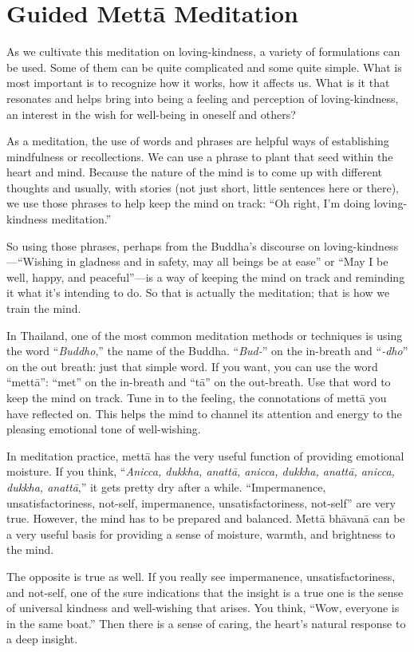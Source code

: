 \chapter{Guided Mettā Meditation}

As we cultivate this meditation on loving-kindness, a variety of
formulations can be used. Some of them can be quite complicated and some
quite simple. What is most important is to recognize how it works, how
it affects us. What is it that resonates and helps bring into being a
feeling and perception of loving-kindness, an interest in the wish for
well-being in oneself and others?

As a meditation, the use of words and phrases are helpful ways of
establishing mindfulness or recollections. We can use a phrase to plant
that seed within the heart and mind. Because the nature of the mind is
to come up with different thoughts and usually, with stories (not just
short, little sentences here or there), we use those phrases to help
keep the mind on track: “Oh right, I’m doing loving-kindness
meditation.”

So using those phrases, perhaps from the Buddha’s discourse on
loving-kindness—“Wishing in gladness and in safety, may all beings be at
ease” or “May I be well, happy, and peaceful”—is a way of keeping the
mind on track and reminding it what it’s intending to do. So that is
actually the meditation; that is how we train the mind.

In Thailand, one of the most common meditation methods or techniques is
using the word “\emph{Buddho},” the name of the Buddha. “\emph{Bud-}” on
the in-breath and “\emph{-dho}” on the out breath: just that simple
word. If you want, you can use the word “mettā”: “met” on the in-breath
and “tā” on the out-breath. Use that word to keep the mind on track.
Tune in to the feeling, the connotations of mettā you have reflected on.
This helps the mind to channel its attention and energy to the pleasing
emotional tone of well-wishing.

In meditation practice, mettā has the very useful function of providing
emotional moisture. If you think, “\emph{Anicca, dukkha, anattā, anicca,
dukkha, anattā, anicca, dukkha, anattā},” it gets pretty dry after a
while. “Impermanence, unsatisfactoriness, not-self, impermanence,
unsatisfactoriness, not-self” are very true. However, the mind has to be
prepared and balanced. Mettā bhāvanā can be a very useful basis for
providing a sense of moisture, warmth, and brightness to the mind.

The opposite is true as well. If you really see impermanence,
unsatisfactoriness, and not-self, one of the sure indications that the
insight is a true one is the sense of universal kindness and
well-wishing that arises. You think, “Wow, everyone is in the same
boat.” Then there is a sense of caring, the heart’s natural response to
a deep insight.

